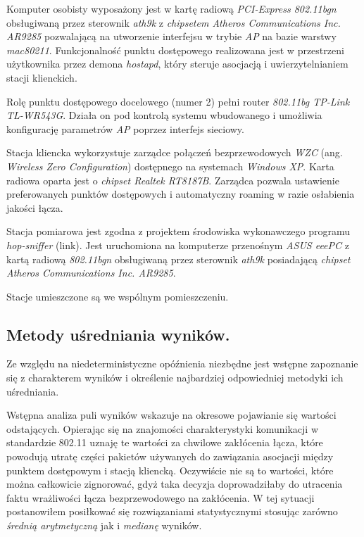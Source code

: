 Komputer osobisty wyposażony jest w kartę radiową \emph{PCI-Express 802.11bgn} obsługiwaną przez sterownik \emph{ath9k} z \emph{chipsetem Atheros Communications Inc. AR9285} pozwalającą na utworzenie interfejsu w trybie \emph{AP} na bazie warstwy \emph{mac80211}. Funkcjonalność punktu dostępowego realizowana jest w przestrzeni użytkownika przez demona \emph{hostapd}, który steruje asocjacją i uwierzytelnianiem stacji klienckich. 

Rolę punktu dostępowego docelowego (numer 2) pełni router \emph{802.11bg TP-Link TL-WR543G}. Działa on pod kontrolą systemu wbudowanego i umożliwia konfigurację parametrów \emph{AP} poprzez interfejs sieciowy. 

Stacja kliencka wykorzystuje zarządce połączeń bezprzewodowych \emph{WZC} (ang. \emph{Wireless Zero Configuration}) dostępnego na systemach \emph{Windows XP}. Karta radiowa oparta jest o \emph{chipset Realtek RT8187B}. Zarządca pozwala ustawienie preferowanych punktów dostępowych i automatyczny roaming w razie osłabienia jakości łącza. 

Stacja pomiarowa jest zgodna z projektem środowiska wykonawczego programu \emph{hop-sniffer} (link). Jest uruchomiona na komputerze przenośnym \emph{ASUS eeePC} z kartą radiową \emph{802.11bgn} obsługiwaną przez sterownik \emph{ath9k} posiadającą \emph{chipset} \emph{Atheros Communications Inc. AR9285}.

Stacje umieszczone są we wspólnym pomieszczeniu.

\subsection{Metody uśredniania wyników.}

Ze względu na niedeterministyczne opóźnienia niezbędne jest wstępne zapoznanie się z charakterem wyników i określenie najbardziej odpowiedniej metodyki ich uśredniania. 

Wstępna analiza puli wyników wskazuje na okresowe pojawianie się wartości odstających. Opierając się na znajomości charakterystyki komunikacji w standardzie 802.11 uznaję te wartości za chwilowe zakłócenia łącza, które powodują utratę części pakietów używanych do zawiązania asocjacji między punktem dostępowym i stacją kliencką. Oczywiście nie są to wartości, które można całkowicie zignorować, gdyż taka decyzja doprowadziłaby do utracenia faktu wrażliwości łącza bezprzewodowego na zakłócenia. W tej sytuacji postanowiłem posiłkować się rozwiązaniami statystycznymi stosując zarówno \emph{średnią arytmetyczną} jak i \emph{medianę} wyników. 

